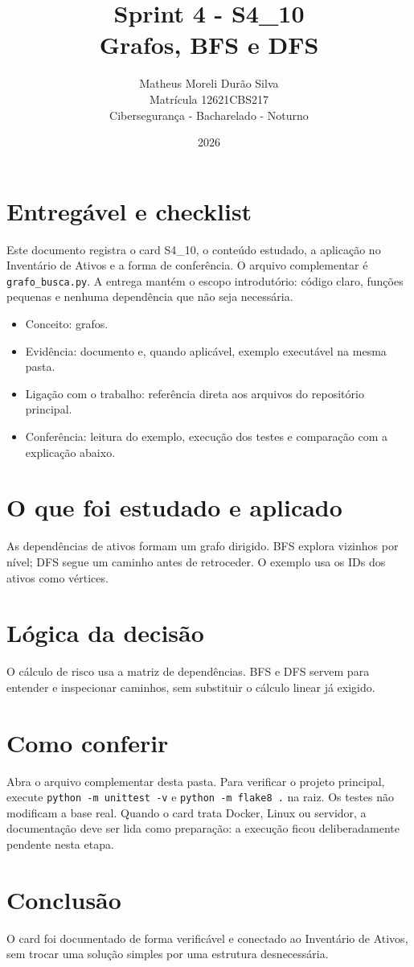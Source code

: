 \documentclass[12pt]{article}
\title{Sprint 4 - S4\_10\\Grafos, BFS e DFS}
\author{Matheus Moreli Durão Silva\\ Matrícula 12621CBS217\\ Cibersegurança - Bacharelado - Noturno}
\date{2026}
\begin{document}
\maketitle

\section*{Entregável e checklist}
Este documento registra o card S4\_10, o conteúdo estudado, a aplicação no Inventário de Ativos e a forma de conferência. O arquivo complementar é \texttt{grafo\_busca.py}. A entrega mantém o escopo introdutório: código claro, funções pequenas e nenhuma dependência que não seja necessária.

\begin{itemize}
\item Conceito: grafos.
\item Evidência: documento e, quando aplicável, exemplo executável na mesma pasta.
\item Ligação com o trabalho: referência direta aos arquivos do repositório principal.
\item Conferência: leitura do exemplo, execução dos testes e comparação com a explicação abaixo.
\end{itemize}

\section*{O que foi estudado e aplicado}
As dependências de ativos formam um grafo dirigido. BFS explora vizinhos por nível; DFS segue um caminho antes de retroceder. O exemplo usa os IDs dos ativos como vértices.

\section*{Lógica da decisão}
O cálculo de risco usa a matriz de dependências. BFS e DFS servem para entender e inspecionar caminhos, sem substituir o cálculo linear já exigido.

\section*{Como conferir}
Abra o arquivo complementar desta pasta. Para verificar o projeto principal, execute \texttt{python -m unittest -v} e \texttt{python -m flake8 .} na raiz. Os testes não modificam a base real. Quando o card trata Docker, Linux ou servidor, a documentação deve ser lida como preparação: a execução ficou deliberadamente pendente nesta etapa.

\section*{Conclusão}
O card foi documentado de forma verificável e conectado ao Inventário de Ativos, sem trocar uma solução simples por uma estrutura desnecessária.
\end{document}
